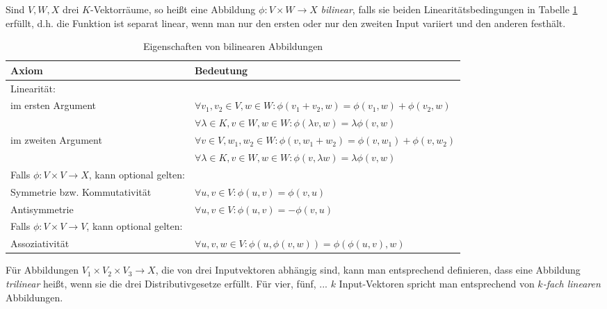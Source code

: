 \begin{definition}\label{bilineare_abb:def}
	Sind $V,W,X$ drei $K$-Vektorräume, so heißt eine Abbildung $\phi: V\times W\to X$ \emph{bilinear}, falls sie beiden Linearitätsbedingungen in Tabelle \ref{bilineare_abb:def_table} erfüllt, d.h. die Funktion ist separat linear, wenn man nur den ersten oder nur den zweiten Input variiert und den anderen festhält.
	
	\begin{table}[!ht]
		\setlength\extrarowheight{10pt} %
		\hspace{-0.1\textwidth}
		\begin{tabularx}{1.2\textwidth}{p{6.5cm} p{9.5cm}}
			\toprule
			\textbf{Axiom}                  & \textbf{Bedeutung} \hspace{0.5cm} \\ 
			\midrule
			Linearität: \\
			\hspace{1cm}im ersten Argument  & $\forall v_1,v_2\in V, w\in W: \phi(v_1+v_2,w) = \phi(v_1,w) + \phi(v_2,w)$ \\
			& $\forall \lambda\in K, v\in W, w\in W: \phi(\lambda v, w) = \lambda \phi(v,w)$ \\
			\hspace{1cm}im zweiten Argument & $\forall v\in V, w_1, w_2\in W: \phi(v,w_1+w_2) = \phi(v,w_1) + \phi(v,w_2)$ \\
			& $\forall \lambda\in K, v\in W, w\in W: \phi(v, \lambda w) = \lambda \phi(v,w)$ \\
			Falls $\phi: V\times V \to X$, kann optional gelten: \\
			\hspace{1cm}Symmetrie bzw. Kommutativität & $\forall u,v\in V: \phi(u,v) = \phi(v,u)$ \\
			\hspace{1cm}Antisymmetrie & $\forall u,v\in V: \phi(u,v) = -\phi(v,u)$ \\
			Falls $\phi: V\times V\to V$, kann optional gelten: \\
			\hspace{1cm}Assoziativität & $\forall u,v,w\in V: \phi(u,\phi(v,w)) = \phi(\phi(u,v),w)$ \\
			\bottomrule
		\end{tabularx}
		\label{bilineare_abb:def_table}
		\caption{Eigenschaften von bilinearen Abbildungen}
	\end{table}
	
	Für Abbildungen $V_1\times V_2\times V_3\to X$, die von drei Inputvektoren abhängig sind, kann man entsprechend definieren, dass eine Abbildung \emph{trilinear} heißt, wenn sie die drei Distributivgesetze erfüllt. Für vier, fünf, ... $k$ Input-Vektoren spricht man entsprechend von \emph{$k$-fach linearen} Abbildungen.
\end{definition}

